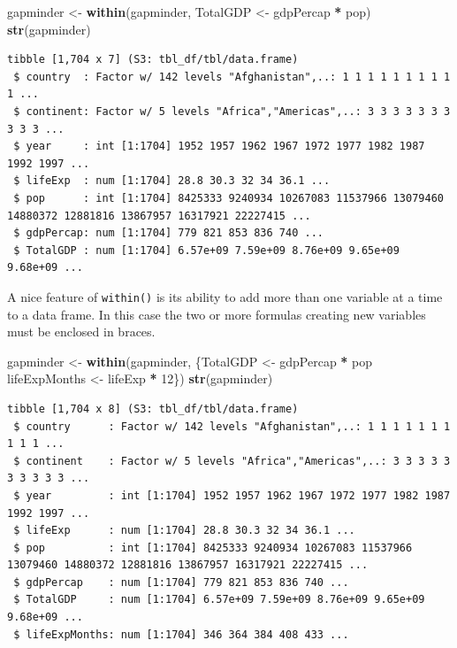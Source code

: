 \documentclass[
]{krantz}
\makeatletter
\newenvironment{Shaded}{\begin{snugshade}}{\end{snugshade}}
\newcommand{\DecValTok}[1]{\textcolor[rgb]{0.06,0.06,0.06}{#1}}
\newcommand{\KeywordTok}[1]{\textcolor[rgb]{0.27,0.27,0.27}{\textbf{#1}}}
\newcommand{\NormalTok}[1]{#1}
\newcommand{\OperatorTok}[1]{\textcolor[rgb]{0.43,0.43,0.43}{\textbf{#1}}}
\newcommand{\StringTok}[1]{\textcolor[rgb]{0.5,0.5,0.5}{#1}}
\newenvironment{kframe}{%
\medskip{}
\setlength{\fboxsep}{.8em}
 \def\at@end@of@kframe{}%
 \ifinner\ifhmode%
  \def\at@end@of@kframe{\end{minipage}}%
  \begin{minipage}{\columnwidth}%
 \fi\fi%
 \def\FrameCommand##1{\hskip\@totalleftmargin \hskip-\fboxsep
 \colorbox{shadecolor}{##1}\hskip-\fboxsep
     \hskip-\linewidth \hskip-\@totalleftmargin \hskip\columnwidth}%
 \MakeFramed {\advance\hsize-\width
   \@totalleftmargin\z@ \linewidth\hsize
   \@setminipage}}%
 {\par\unskip\endMakeFramed%
 \at@end@of@kframe}
\renewenvironment{Shaded}{\begin{kframe}}{\end{kframe}}
\makeatother
\begin{document}
\begin{Shaded}
\begin{Highlighting}[]
\NormalTok{gapminder \textless{}{-}}\StringTok{ }\KeywordTok{within}\NormalTok{(gapminder, TotalGDP \textless{}{-}}\StringTok{ }\NormalTok{gdpPercap }\OperatorTok{*}\StringTok{ }\NormalTok{pop)}
\KeywordTok{str}\NormalTok{(gapminder)}
\end{Highlighting}
\end{Shaded}

\begin{verbatim}
tibble [1,704 x 7] (S3: tbl_df/tbl/data.frame)
 $ country  : Factor w/ 142 levels "Afghanistan",..: 1 1 1 1 1 1 1 1 1 1 ...
 $ continent: Factor w/ 5 levels "Africa","Americas",..: 3 3 3 3 3 3 3 3 3 3 ...
 $ year     : int [1:1704] 1952 1957 1962 1967 1972 1977 1982 1987 1992 1997 ...
 $ lifeExp  : num [1:1704] 28.8 30.3 32 34 36.1 ...
 $ pop      : int [1:1704] 8425333 9240934 10267083 11537966 13079460 14880372 12881816 13867957 16317921 22227415 ...
 $ gdpPercap: num [1:1704] 779 821 853 836 740 ...
 $ TotalGDP : num [1:1704] 6.57e+09 7.59e+09 8.76e+09 9.65e+09 9.68e+09 ...
\end{verbatim}

A nice feature of \texttt{within()} is its ability to add more than one variable at a time to a data frame. In this case the two or more formulas creating new variables must be enclosed in braces.

\begin{Shaded}
\begin{Highlighting}[]
\NormalTok{gapminder \textless{}{-}}\StringTok{ }\KeywordTok{within}\NormalTok{(gapminder, \{TotalGDP \textless{}{-}}\StringTok{ }\NormalTok{gdpPercap }\OperatorTok{*}\StringTok{ }\NormalTok{pop}
\NormalTok{    lifeExpMonths \textless{}{-}}\StringTok{ }\NormalTok{lifeExp }\OperatorTok{*}\StringTok{ }\DecValTok{12}\NormalTok{\})}
\KeywordTok{str}\NormalTok{(gapminder)}
\end{Highlighting}
\end{Shaded}

\begin{verbatim}
tibble [1,704 x 8] (S3: tbl_df/tbl/data.frame)
 $ country      : Factor w/ 142 levels "Afghanistan",..: 1 1 1 1 1 1 1 1 1 1 ...
 $ continent    : Factor w/ 5 levels "Africa","Americas",..: 3 3 3 3 3 3 3 3 3 3 ...
 $ year         : int [1:1704] 1952 1957 1962 1967 1972 1977 1982 1987 1992 1997 ...
 $ lifeExp      : num [1:1704] 28.8 30.3 32 34 36.1 ...
 $ pop          : int [1:1704] 8425333 9240934 10267083 11537966 13079460 14880372 12881816 13867957 16317921 22227415 ...
 $ gdpPercap    : num [1:1704] 779 821 853 836 740 ...
 $ TotalGDP     : num [1:1704] 6.57e+09 7.59e+09 8.76e+09 9.65e+09 9.68e+09 ...
 $ lifeExpMonths: num [1:1704] 346 364 384 408 433 ...
\end{verbatim}
\end{document}
